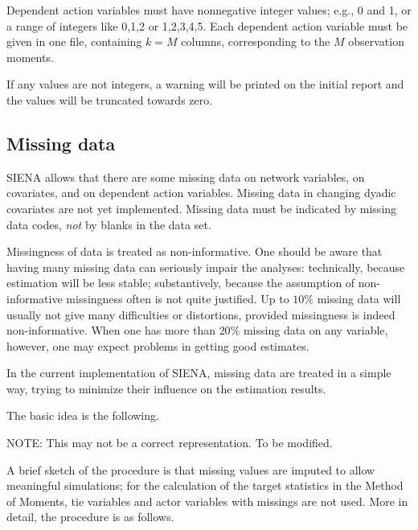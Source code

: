 \documentclass[a4paper,fleqn]{article}
\newcommand{\+}{\, + \,}
\newcommand{\SI}{{\sf SIENA }}
\newcommand{\si}{{\sf SIENA}}
\begin{document}
{Dependent action variables must have nonnegative integer values;
e.g., 0 and 1, or a range of integers like 0,1,2 or 1,2,3,4,5.
Each dependent action variable must be given in one
file, containing $k = M$ columns, corresponding to the $M$
observation moments.

If any values are not integers, a warning will be printed on the initial report
and the values will be truncated towards zero.


\begin{screen}
\newpage
\end{screen}
\subsection{Missing data}

\SI allows that there are some missing data on network variables,
on covariates, and on dependent action
variables. Missing data in changing dyadic covariates are not yet
implemented. Missing data must be indicated by missing data codes,
{\em not} by blanks in the data set.

Missingness of data is treated as non-informative.
One should be aware that having many missing data can seriously
impair the analyses: technically, because estimation will be
less stable; substantively, because the assumption of
non-informative missingness often is not quite justified.
Up to $10\%$ missing data will usually not give many difficulties
or distortions, provided missingness is indeed non-informative.
When one has more than $20\%$ missing data on any variable, however,
one may expect problems in getting good estimates.

In the current implementation of \si, missing data are treated in
a simple way, trying to minimize their influence on the estimation
results.

The basic idea is the following.
\medskip

NOTE: This may not be a correct representation. To be modified.
\medskip

A brief sketch of the procedure is that
missing values are imputed to allow meaningful simulations;
for the calculation of the target statistics in the Method of Moments,
tie variables and actor variables with missings are not
used.
More in detail, the procedure is as follows.

}
\end{document}
